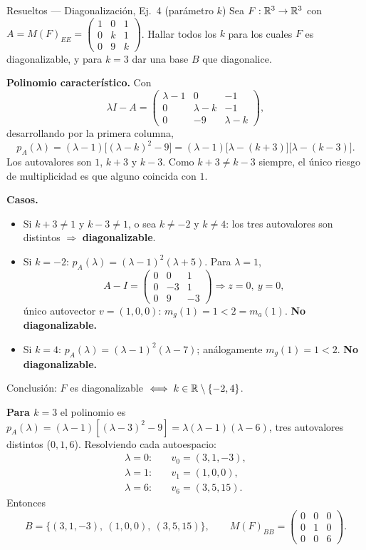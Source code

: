 \begin{ejemplo}{Resueltos — Diagonalización, Ej.\ 4 (parámetro $k$)}
Sea $F:\mathbb{R}^3\to\mathbb{R}^3$ con $A = M(F)_{EE} = \begin{pmatrix} 1 & 0 & 1 \\ 0 & k & 1 \\ 0 & 9 & k \end{pmatrix}$. Hallar todos los $k$ para los cuales $F$ es diagonalizable, y para $k=3$ dar una base $B$ que diagonalice.

\textbf{Polinomio característico.} Con
\[
\lambda I - A = \begin{pmatrix} \lambda - 1 & 0 & -1 \\ 0 & \lambda - k & -1 \\ 0 & -9 & \lambda - k \end{pmatrix},
\]
desarrollando por la primera columna,
\[
p_A(\lambda) = (\lambda - 1)\bigl[(\lambda - k)^2 - 9\bigr] = (\lambda - 1)\bigl[\lambda - (k+3)\bigr]\bigl[\lambda - (k-3)\bigr].
\]
Los autovalores son $1$, $k+3$ y $k-3$. Como $k+3 \neq k-3$ siempre, el único riesgo de multiplicidad es que alguno coincida con $1$.

\textbf{Casos.}
\begin{itemize}
\item Si $k+3 \neq 1$ y $k-3 \neq 1$, o sea $k \neq -2$ y $k \neq 4$: los tres autovalores son distintos $\Rightarrow$ \textbf{diagonalizable}.
\item Si $k = -2$: $p_A(\lambda) = (\lambda - 1)^2(\lambda + 5)$. Para $\lambda = 1$,
\[
A - I = \begin{pmatrix} 0 & 0 & 1 \\ 0 & -3 & 1 \\ 0 & 9 & -3 \end{pmatrix} \Rightarrow z = 0,\ y = 0,
\]
único autovector $v = (1,0,0)$: $m_g(1) = 1 < 2 = m_a(1)$. \textbf{No diagonalizable.}
\item Si $k = 4$: $p_A(\lambda) = (\lambda - 1)^2(\lambda - 7)$; análogamente $m_g(1) = 1 < 2$. \textbf{No diagonalizable.}
\end{itemize}
Conclusión: $F$ es diagonalizable $\iff k \in \mathbb{R} \setminus \{-2, 4\}$.

\textbf{Para $k = 3$} el polinomio es $p_A(\lambda) = (\lambda - 1)[(\lambda - 3)^2 - 9] = \lambda(\lambda - 1)(\lambda - 6)$, tres autovalores distintos ($0,1,6$). Resolviendo cada autoespacio:
\begin{align*}
\lambda = 0:&\quad v_0 = (3, 1, -3), \\
\lambda = 1:&\quad v_1 = (1, 0, 0), \\
\lambda = 6:&\quad v_6 = (3, 5, 15).
\end{align*}
Entonces
\[
B = \{(3,1,-3),\ (1,0,0),\ (3,5,15)\}, \qquad M(F)_{BB} = \begin{pmatrix} 0 & 0 & 0 \\ 0 & 1 & 0 \\ 0 & 0 & 6 \end{pmatrix}.
\]
\end{ejemplo}

